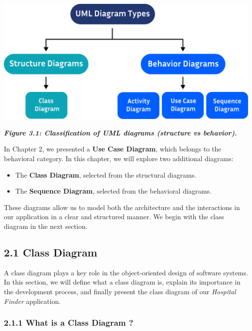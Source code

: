 \documentclass[12pt]{report}
\begin{document}
\begin{center}
	\vspace{1.5cm}
	\hspace{1cm}
	\includegraphics[width=14cm]{images/diagramType.pdf}

\end{center}
\begin{center}
	\textit{\textbf{Figure 3.1: Classification of UML diagrams (structure vs behavior).}}
\end{center}
\vspace{0.5cm}
\noindent In Chapter 2, we presented a \textbf{Use Case Diagram}, which belongs to the behavioral category. In this chapter, we will explore two additional diagrams:
\begin{itemize}
	\item The \textbf{Class Diagram}, selected from the structural diagrams.
	\item The \textbf{Sequence Diagram}, selected from the behavioral diagrams.
\end{itemize}

\noindent These diagrams allow us to model both the architecture and the interactions in our application in a clear and structured manner. We begin with the class diagram in the next section.

\subsection*{2.1 Class Diagram}

A class diagram plays a key role in the object-oriented design of software systems. In this section, we will define what a class diagram is, explain its importance in the development process, and finally present the class diagram of our \textit{Hospital Finder} application.

\subsubsection*{2.1.1 What is a Class Diagram ?}
\end{document}
